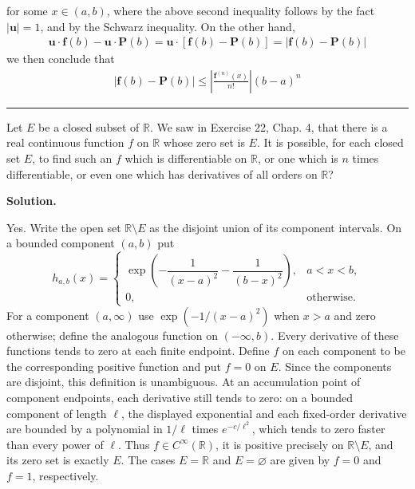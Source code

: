 \documentclass[12pt]{article}
\theoremstyle{definition}
\begin{document}
for some $x\in(a,b)$, where the above second inequality follows by the fact $\left\vert\mathbf{u}\right\vert=1$, and by the Schwarz inequality. On the other hand,
\begin{align*}
\mathbf{u}\cdot\mathbf{f}(b)-\mathbf{u}\cdot\mathbf{P}(b)
=\mathbf{u}\cdot\left[\mathbf{f}(b)-\mathbf{P}(b)\right]
=\left\vert\mathbf{f}(b)-\mathbf{P}(b)\right\vert
\end{align*}
we then conclude that
\begin{align*}
\left\vert\mathbf{f}(b)-\mathbf{P}(b)\right\vert
\le\left\vert\frac{\mathbf{f}^{(n)}(x)}{n!}\right\vert(b-a)^n
\end{align*}



\bigskip\noindent\hrule\bigskip

Let $E$ be a closed subset of $\mathbb{R}$. We saw in Exercise 22, Chap. 4, that there is a real continuous function $f$ on $\mathbb{R}$ whose zero set is $E$. It is possible, for each closed set $E$, to find such an $f$ which is differentiable on $\mathbb{R}$, or one which is $n$ times differentiable, or even one which has derivatives of all orders on $\mathbb{R}$?

\smallskip
\noindent\textbf{Solution.}\quad

Yes.  Write the open set $\mathbb{R}\setminus E$ as the disjoint union of its component intervals.  On a bounded component $(a,b)$ put
\[
 h_{a,b}(x)=
 \begin{cases}
 \exp\!\left(-\dfrac{1}{(x-a)^2}-\dfrac{1}{(b-x)^2}\right),&a<x<b,\\
 0,&\text{otherwise}.
 \end{cases}
\]
For a component $(a,\infty)$ use $\exp(-1/(x-a)^2)$ when $x>a$ and zero otherwise; define the analogous function on $(-\infty,b)$.  Every derivative of these functions tends to zero at each finite endpoint.  Define $f$ on each component to be the corresponding positive function and put $f=0$ on $E$.  Since the components are disjoint, this definition is unambiguous.  At an accumulation point of component endpoints, each derivative still tends to zero: on a bounded component of length $\ell$, the displayed exponential and each fixed-order derivative are bounded by a polynomial in $1/\ell$ times $e^{-c/\ell^2}$, which tends to zero faster than every power of $\ell$.  Thus $f\in C^\infty(\mathbb{R})$, it is positive precisely on $\mathbb{R}\setminus E$, and its zero set is exactly $E$.  The cases $E=\mathbb{R}$ and $E=\varnothing$ are given by $f=0$ and $f=1$, respectively.
\end{document}
